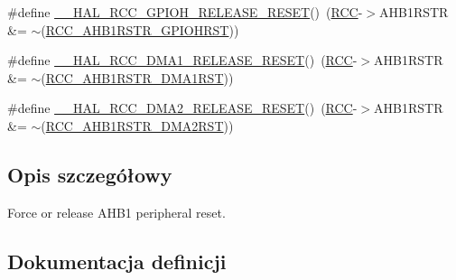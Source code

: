 \begin{DoxyCompactItemize}
\item 
\#define \hyperlink{group___r_c_c___a_h_b1___force___release___reset_gaaf11aa8bacb98c4e567bbaa58635acec}{\+\_\+\+\_\+\+H\+A\+L\+\_\+\+R\+C\+C\+\_\+\+G\+P\+I\+O\+H\+\_\+\+R\+E\+L\+E\+A\+S\+E\+\_\+\+R\+E\+S\+ET}()~(\hyperlink{group___peripheral__declaration_ga74944438a086975793d26ae48d5882d4}{R\+CC}-\/$>$A\+H\+B1\+R\+S\+TR \&= $\sim$(\hyperlink{group___peripheral___registers___bits___definition_ga587e3e32701cbd127d2afb19b9bff5fd}{R\+C\+C\+\_\+\+A\+H\+B1\+R\+S\+T\+R\+\_\+\+G\+P\+I\+O\+H\+R\+ST}))
\item 
\#define \hyperlink{group___r_c_c___a_h_b1___force___release___reset_ga8f7eef8316c35175df11d77f5106d334}{\+\_\+\+\_\+\+H\+A\+L\+\_\+\+R\+C\+C\+\_\+\+D\+M\+A1\+\_\+\+R\+E\+L\+E\+A\+S\+E\+\_\+\+R\+E\+S\+ET}()~(\hyperlink{group___peripheral__declaration_ga74944438a086975793d26ae48d5882d4}{R\+CC}-\/$>$A\+H\+B1\+R\+S\+TR \&= $\sim$(\hyperlink{group___peripheral___registers___bits___definition_ga4d1655ddfb777fce28b1d6b9a9c2d0e0}{R\+C\+C\+\_\+\+A\+H\+B1\+R\+S\+T\+R\+\_\+\+D\+M\+A1\+R\+ST}))
\item 
\#define \hyperlink{group___r_c_c___a_h_b1___force___release___reset_gab7d22b3d82cd2616c8e3fa930e437757}{\+\_\+\+\_\+\+H\+A\+L\+\_\+\+R\+C\+C\+\_\+\+D\+M\+A2\+\_\+\+R\+E\+L\+E\+A\+S\+E\+\_\+\+R\+E\+S\+ET}()~(\hyperlink{group___peripheral__declaration_ga74944438a086975793d26ae48d5882d4}{R\+CC}-\/$>$A\+H\+B1\+R\+S\+TR \&= $\sim$(\hyperlink{group___peripheral___registers___bits___definition_ga827aea44c35a0c3eb815a5d7d8546c7b}{R\+C\+C\+\_\+\+A\+H\+B1\+R\+S\+T\+R\+\_\+\+D\+M\+A2\+R\+ST}))
\end{DoxyCompactItemize}


\subsection{Opis szczegółowy}
Force or release A\+H\+B1 peripheral reset. 



\subsection{Dokumentacja definicji}
\mbox{\label{group___r_c_c___a_h_b1___force___release___reset_ga87d828d91e67aaa931853a60779826c2}} 
